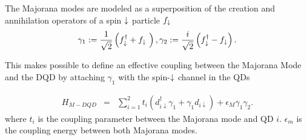 \documentclass[showpacs,aps,prb,reprint,superscriptaddress]{revtex4-1}
\newcommand{\Jesus}[1]{\textcolor{red}{\fbox{Jesus} {\sl#1}}}
\begin{document}
The Majorana modes are modeled as a superposition of the creation and annihilation operators of a spin $\downarrow$ particle $f_\downarrow$
\begin{equation}
    \gamma_1 := \frac{1}{\sqrt{2}} \left( f^\dagger_{\downarrow} + f_{\downarrow}\ \right) , \gamma_2 := \frac{i}{\sqrt{2}} \left( f^\dagger_{\downarrow} - f_{\downarrow} \right). \label{eq:MajOp}
\end{equation}


This makes possible to define an effective coupling between the Majorana Mode and the DQD by attaching $\gamma_1$ with the spin-$\downarrow$ channel in the QDs

\begin{eqnarray}
H_{M-DQD} & = &  \sum_{i=1}^2t_{i} \left(d_{i\downarrow}^{\dagger}\gamma_{1}+\gamma_{1}d_{i\downarrow}\right) + \epsilon_M \gamma_1\gamma_2. 
\label{eq:H_MDQD}
\end{eqnarray}
where $t_i$ is the coupling parameter between the Majorana mode and QD $i$. $\epsilon_m$ is the coupling energy between both Majorana modes.









\end{document}
